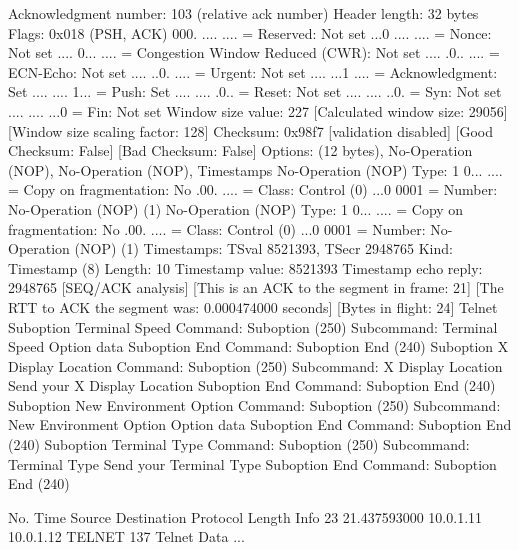     Acknowledgment number: 103    (relative ack number)
    Header length: 32 bytes
    Flags: 0x018 (PSH, ACK)
        000. .... .... = Reserved: Not set
        ...0 .... .... = Nonce: Not set
        .... 0... .... = Congestion Window Reduced (CWR): Not set
        .... .0.. .... = ECN-Echo: Not set
        .... ..0. .... = Urgent: Not set
        .... ...1 .... = Acknowledgment: Set
        .... .... 1... = Push: Set
        .... .... .0.. = Reset: Not set
        .... .... ..0. = Syn: Not set
        .... .... ...0 = Fin: Not set
    Window size value: 227
    [Calculated window size: 29056]
    [Window size scaling factor: 128]
    Checksum: 0x98f7 [validation disabled]
        [Good Checksum: False]
        [Bad Checksum: False]
    Options: (12 bytes), No-Operation (NOP), No-Operation (NOP), Timestamps
        No-Operation (NOP)
            Type: 1
                0... .... = Copy on fragmentation: No
                .00. .... = Class: Control (0)
                ...0 0001 = Number: No-Operation (NOP) (1)
        No-Operation (NOP)
            Type: 1
                0... .... = Copy on fragmentation: No
                .00. .... = Class: Control (0)
                ...0 0001 = Number: No-Operation (NOP) (1)
        Timestamps: TSval 8521393, TSecr 2948765
            Kind: Timestamp (8)
            Length: 10
            Timestamp value: 8521393
            Timestamp echo reply: 2948765
    [SEQ/ACK analysis]
        [This is an ACK to the segment in frame: 21]
        [The RTT to ACK the segment was: 0.000474000 seconds]
        [Bytes in flight: 24]
Telnet
    Suboption Terminal Speed
        Command: Suboption (250)
        Subcommand: Terminal Speed
            Option data
    Suboption End
        Command: Suboption End (240)
    Suboption X Display Location
        Command: Suboption (250)
        Subcommand: X Display Location
            Send your X Display Location
    Suboption End
        Command: Suboption End (240)
    Suboption New Environment Option
        Command: Suboption (250)
        Subcommand: New Environment Option
            Option data
    Suboption End
        Command: Suboption End (240)
    Suboption Terminal Type
        Command: Suboption (250)
        Subcommand: Terminal Type
            Send your Terminal Type
    Suboption End
        Command: Suboption End (240)

No.     Time           Source                Destination           Protocol Length Info
     23 21.437593000   10.0.1.11             10.0.1.12             TELNET   137    Telnet Data ...

